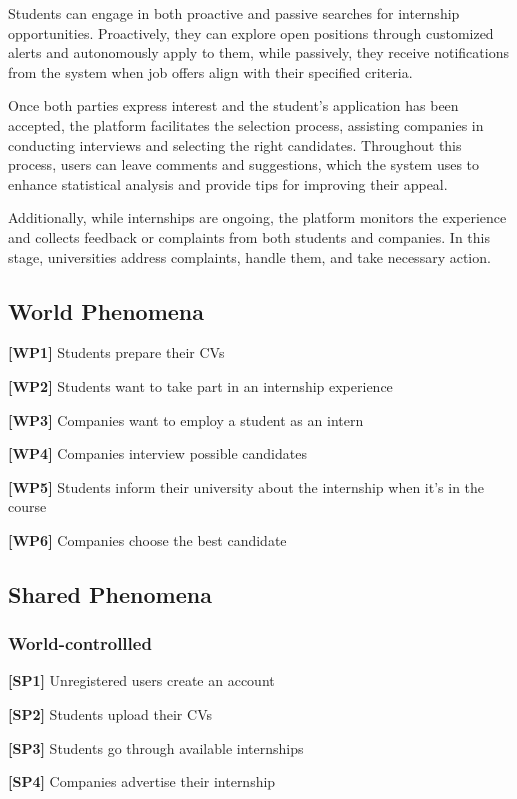 Students can engage in both proactive and passive searches for internship opportunities. Proactively, they can explore open positions through customized alerts and autonomously apply to them, while passively, they receive notifications from the system when job offers align with their specified criteria.

Once both parties express interest and the student's application has been accepted, the platform facilitates the selection process, assisting companies in conducting interviews and selecting the right candidates. Throughout this process, users can leave comments and suggestions, which the system uses to enhance statistical analysis and provide tips for improving their appeal.

Additionally, while internships are ongoing, the platform monitors the experience and collects feedback or complaints from both students and companies. In this stage, universities address complaints, handle them, and take necessary action.

\subsection{World Phenomena}
\textbf{[WP1]} Students prepare their CVs

\textbf{[WP2]} Students want to take part in an internship experience 

\textbf{[WP3]} Companies want to employ a student as an intern 

\textbf{[WP4]} Companies interview possible candidates 

\textbf{[WP5]} Students inform their university about the internship when it's in the course

\textbf{[WP6]} Companies choose the best candidate

\subsection{Shared Phenomena}

\subsubsection{World-controllled}

\textbf{[SP1]} Unregistered users create an account

\textbf{[SP2]} Students upload their CVs

\textbf{[SP3]} Students go through available internships

\textbf{[SP4]} Companies advertise their internship

